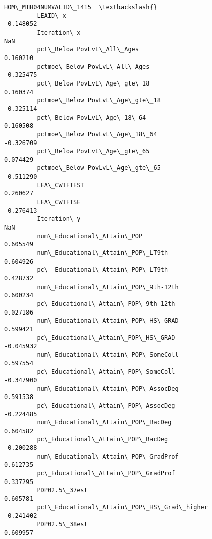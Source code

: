 \documentclass[11pt]{article}
\begin{document}
\begin{Verbatim}[commandchars=\\\{\}]
                                                    HOM\_MTH04NUMVALID\_1415  \textbackslash{}
         LEAID\_x                                                 -0.148052   
         Iteration\_x                                                   NaN   
         pct\_Below PovLvL\_All\_Ages                                0.160210   
         pctmoe\_Below PovLvL\_All\_Ages                            -0.325475   
         pct\_Below PovLvL\_Age\_gte\_18                              0.160374   
         pctmoe\_Below PovLvL\_Age\_gte\_18                          -0.325114   
         pct\_Below PovLvL\_Age\_18\_64                               0.160508   
         pctmoe\_Below PovLvL\_Age\_18\_64                           -0.326709   
         pct\_Below PovLvL\_Age\_gte\_65                              0.074429   
         pctmoe\_Below PovLvL\_Age\_gte\_65                          -0.511290   
         LEA\_CWIFTEST                                             0.260627   
         LEA\_CWIFTSE                                             -0.276413   
         Iteration\_y                                                   NaN   
         num\_Educational\_Attain\_POP                               0.605549   
         num\_Educational\_Attain\_POP\_LT9th                         0.604926   
         pc\_ Educational\_Attain\_POP\_LT9th                         0.428732   
         num\_Educational\_Attain\_POP\_9th-12th                      0.600234   
         pc\_Educational\_Attain\_POP\_9th-12th                       0.027186   
         num\_Educational\_Attain\_POP\_HS\_GRAD                       0.599421   
         pc\_Educational\_Attain\_POP\_HS\_GRAD                       -0.045932   
         num\_Educational\_Attain\_POP\_SomeColl                      0.597554   
         pc\_Educational\_Attain\_POP\_SomeColl                      -0.347900   
         num\_Educational\_Attain\_POP\_AssocDeg                      0.591538   
         pc\_Educational\_Attain\_POP\_AssocDeg                      -0.224485   
         num\_Educational\_Attain\_POP\_BacDeg                        0.604582   
         pc\_Educational\_Attain\_POP\_BacDeg                        -0.200288   
         num\_Educational\_Attain\_POP\_GradProf                      0.612735   
         pc\_Educational\_Attain\_POP\_GradProf                       0.337295   
         PDP02.5\_37est                                            0.605781   
         pct\_Educational\_Attain\_POP\_HS\_Grad\_higher               -0.241402   
         PDP02.5\_38est                                            0.609957   

\end{Verbatim}
\end{document}
